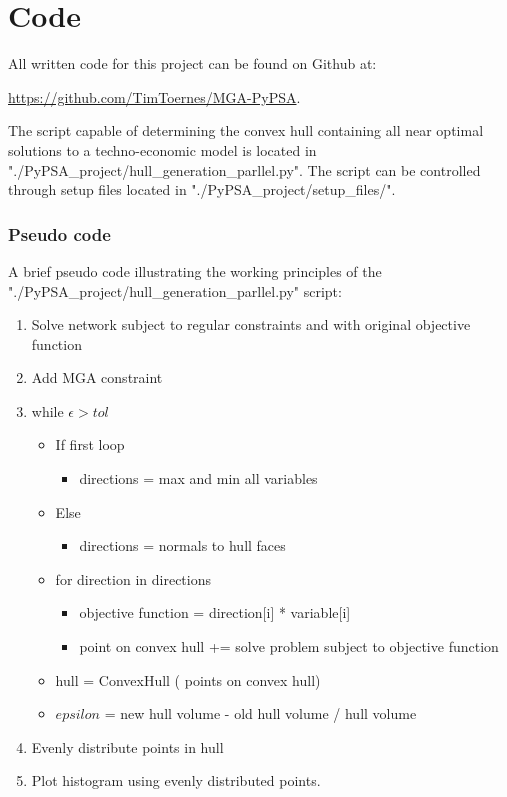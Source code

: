 

\chapter{Code}


All written code for this project can be found on Github at:

 \url{https://github.com/TimToernes/MGA-PyPSA}. 
 
The script capable of determining the convex hull containing all near optimal solutions to a techno-economic model is located in "./PyPSA\_project/hull\_generation\_parllel.py". The script can be controlled through setup files located in  "./PyPSA\_project/setup\_files/".

\subsection{Pseudo code}

A brief pseudo code illustrating the working principles of the "./PyPSA\_project/hull\_generation\_parllel.py" script:

\begin{enumerate}[label={}]
\item Solve network subject to regular constraints and with original objective function
\item Add MGA constraint 
\item while $\epsilon>tol$
\begin{itemize}[label={}]
\item If first loop
\begin{itemize}[label={}]
\item directions = max and min all variables
\end{itemize}
\item Else
\begin{itemize}[label={}]
\item directions = normals to hull faces
\end{itemize}
\item for direction in directions
\begin{itemize}[label={}]
\item objective function = direction[i] * variable[i]
\item point on convex hull += solve problem subject to objective function
\end{itemize}
\item hull = ConvexHull ( points on convex hull)
\item $epsilon$ = new hull volume - old hull volume / hull volume
\end{itemize}
\item Evenly distribute points in hull 
\item Plot histogram using evenly distributed points. 
\end{enumerate}




